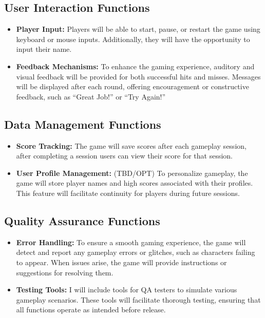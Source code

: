 \documentclass{article}
\begin{document}
\subsection{User Interaction Functions}
\begin{itemize}
    \item \textbf{Player Input:} Players will be able to start, pause, or restart the game using keyboard or mouse inputs. Additionally, they will have the opportunity to input their name.
    \item \textbf{Feedback Mechanisms:} To enhance the gaming experience, auditory and visual feedback will be provided for both successful hits and misses. Messages will be displayed after each round, offering encouragement or constructive feedback, such as “Great Job!” or “Try Again!”
\end{itemize}

\subsection{Data Management Functions}
\begin{itemize}
    \item \textbf{Score Tracking:} The game will save scores after each gameplay session, after completing a session users can view their score for that session.
    \item \textbf{User Profile Management:} (TBD/OPT) To personalize gameplay, the game will store player names and high scores associated with their profiles. This feature will facilitate continuity for players during future sessions.
\end{itemize}

\subsection{Quality Assurance Functions}
\begin{itemize}
    \item \textbf{Error Handling:} To ensure a smooth gaming experience, the game will detect and report any gameplay errors or glitches, such as characters failing to appear. When issues arise, the game will provide instructions or suggestions for resolving them.
    \item \textbf{Testing Tools:} I will include tools for QA testers to simulate various gameplay scenarios. These tools will facilitate thorough testing, ensuring that all functions operate as intended before release.
\end{itemize}
\end{document}
